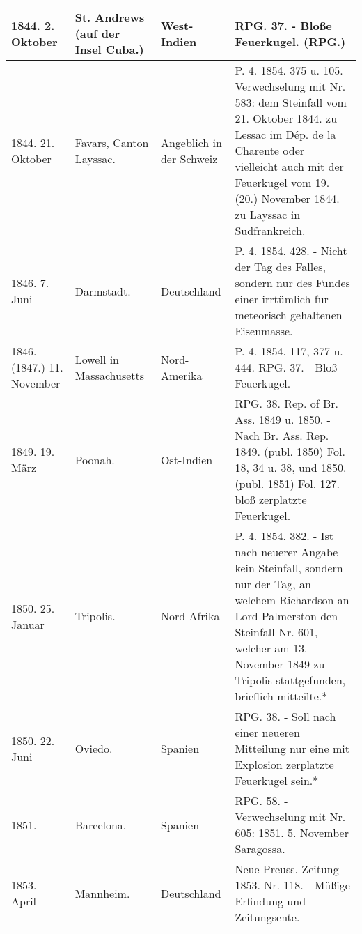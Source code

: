 \documentclass[a4paper, 8pt, oneside, polutonikogreek, german]{article}
\begin{document}
\begin{center}
\begin{longtable}{| p{20mm} | p{25mm} | p{16mm} | p{50mm} |}
        1844. 2. Oktober & St. Andrews (auf der Insel Cuba.) & West-Indien & RPG. 37. - Bloße Feuerkugel. (RPG.) \\ \hline
        1844. 21. Oktober & Favars, Canton Layssac. & Angeblich in der Schweiz & P. 4. 1854. 375 u. 105. - Verwechselung mit Nr. 583: dem Steinfall vom 21. Oktober 1844. zu Lessac im Dép. de la Charente oder vielleicht auch mit der Feuerkugel vom 19. (20.) November 1844. zu Layssac in Sudfrankreich. \\ \hline
        1846. 7. Juni & Darmstadt. & Deutschland & P. 4. 1854. 428. - Nicht der Tag des Falles, sondern nur des Fundes einer irrtümlich fur meteorisch gehaltenen Eisenmasse. \\ \hline
        1846. (1847.) 11. November & Lowell in Massachusetts & Nord-Amerika & P. 4. 1854. 117, 377 u. 444. RPG. 37. - Bloß Feuerkugel. \\ \hline
        1849. 19. März & Poonah. & Ost-Indien & RPG. 38. Rep. of Br. Ass. 1849 u. 1850. - Nach Br. Ass. Rep. 1849. (publ. 1850) Fol. 18, 34 u. 38, und 1850. (publ. 1851) Fol. 127. bloß zerplatzte Feuerkugel. \\ \hline
        1850. 25. Januar & Tripolis. & Nord-Afrika & P. 4. 1854. 382. - Ist nach neuerer Angabe kein Steinfall, sondern nur der Tag, an welchem Richardson an Lord Palmerston den Steinfall Nr. 601, welcher am 13. November 1849 zu Tripolis stattgefunden, brieflich mitteilte.* \\ \hline
        1850. 22. Juni & Oviedo. & Spanien & RPG. 38. - Soll nach einer neueren Mitteilung nur eine mit Explosion zerplatzte Feuerkugel sein.* \\ \hline
        1851. - - & Barcelona. & Spanien & RPG. 58. - Verwechselung mit Nr. 605: 1851. 5. November Saragossa. \\ \hline
        1853. - April & Mannheim. & Deutschland & Neue Preuss. Zeitung 1853. Nr. 118. - Müßige Erfindung und Zeitungsente. \\ \hline
    \end{longtable}
\end{center}
\clearpage
\end{document}
